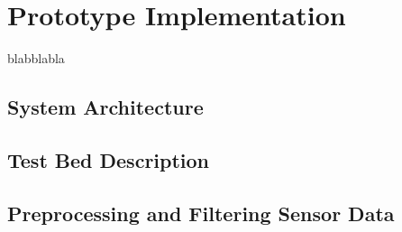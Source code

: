 \chapter{Prototype Implementation}
\label{chap:referenceimplementation}

blabblabla

\section{System Architecture}

\section{Test Bed Description}
\label{sec:test_bed}

\section{Preprocessing and Filtering Sensor Data}